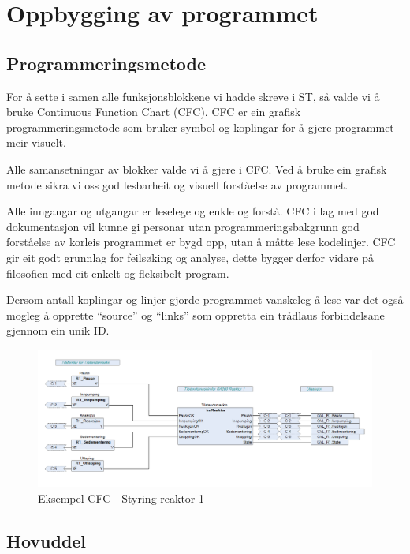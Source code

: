 \newpage
\section{Oppbygging av programmet}
\thispagestyle{fancy}

\subsection{Programmeringsmetode}
For å sette i samen alle funksjonsblokkene vi hadde skreve i \gls{ST}, så valde vi å bruke  Continuous Function Chart (\gls{CFC}).
\gls{CFC} er ein grafisk programmeringsmetode som bruker symbol og koplingar for å gjere programmet  meir visuelt.

Alle samansetningar av blokker valde vi å gjere i \gls{CFC}. Ved å bruke ein grafisk metode sikra vi oss god lesbarheit og
visuell forståelse av programmet. 

Alle inngangar og utgangar er leselege og enkle og forstå. \gls{CFC} i lag med god dokumentasjon vil kunne gi personar utan programmeringsbakgrunn
god forståelse av korleis programmet er bygd opp, utan å måtte lese kodelinjer.
\gls{CFC} gir eit godt grunnlag for feilsøking og analyse, dette bygger derfor vidare på filosofien med eit enkelt og fleksibelt program.

Dersom antall koplingar og linjer gjorde programmet vanskeleg å lese var det også
mogleg å opprette ``source'' og ``links'' som oppretta ein trådlaus forbindelsane gjennom ein unik ID.

\begin{figure}[htbp]
    \centering
    \includegraphics[width=1\textwidth]{Bilder/ReaktorPRG.png}
    \caption{Eksempel \gls{CFC} - Styring reaktor 1}\label{fig:CFCReaktor}
\end{figure}

\newpage

\subsection{Hovuddel}

